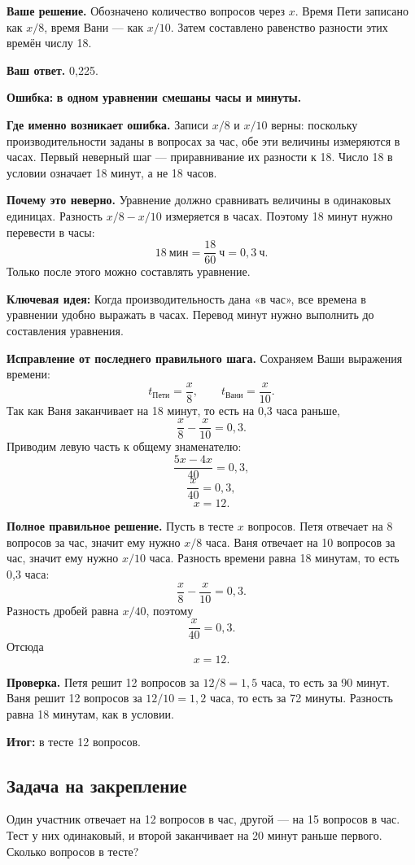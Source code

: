 \documentclass[12pt,a4paper]{article}
\newcommand{\errorlabel}[1]{\textcolor{errred}{\textbf{Ошибка:}} \textbf{#1}}
\newcommand{\keyidea}[1]{\textcolor{ideablue}{\textbf{Ключевая идея:}} #1}
\newcommand{\finalresult}[1]{\textcolor{resultteal}{\textbf{Итог:}} #1}
\begin{document}
\textbf{Ваше решение.} Обозначено количество вопросов через $x$. Время Пети записано как $x/8$, время Вани --- как $x/10$. Затем составлено равенство разности этих времён числу 18.

\textbf{Ваш ответ.} 0,225.

\errorlabel{в одном уравнении смешаны часы и минуты.}

\textbf{Где именно возникает ошибка.} Записи $x/8$ и $x/10$ верны: поскольку производительности заданы в вопросах за час, обе эти величины измеряются в часах. Первый неверный шаг --- приравнивание их разности к 18. Число 18 в условии означает 18 минут, а не 18 часов.

\textbf{Почему это неверно.} Уравнение должно сравнивать величины в одинаковых единицах. Разность $x/8-x/10$ измеряется в часах. Поэтому 18 минут нужно перевести в часы:
\[
18\ \text{мин}=\frac{18}{60}\ \text{ч}=0{,}3\ \text{ч}.
\]
Только после этого можно составлять уравнение.

\keyidea{Когда производительность дана «в час», все времена в уравнении удобно выражать в часах. Перевод минут нужно выполнить до составления уравнения.}

\textbf{Исправление от последнего правильного шага.} Сохраняем Ваши выражения времени:
\[
t_{\text{Пети}}=\frac{x}{8},\qquad t_{\text{Вани}}=\frac{x}{10}.
\]
Так как Ваня заканчивает на 18 минут, то есть на 0,3 часа раньше,
\[
\frac{x}{8}-\frac{x}{10}=0{,}3.
\]
Приводим левую часть к общему знаменателю:
\[
\frac{5x-4x}{40}=0{,}3,
\]
\[
\frac{x}{40}=0{,}3,
\]
\[
x=12.
\]

\textbf{Полное правильное решение.} Пусть в тесте $x$ вопросов. Петя отвечает на 8 вопросов за час, значит ему нужно $x/8$ часа. Ваня отвечает на 10 вопросов за час, значит ему нужно $x/10$ часа. Разность времени равна 18 минутам, то есть 0,3 часа:
\[
\frac{x}{8}-\frac{x}{10}=0{,}3.
\]
Разность дробей равна $x/40$, поэтому
\[
\frac{x}{40}=0{,}3.
\]
Отсюда
\[
x=12.
\]

\textbf{Проверка.} Петя решит 12 вопросов за $12/8=1{,}5$ часа, то есть за 90 минут. Ваня решит 12 вопросов за $12/10=1{,}2$ часа, то есть за 72 минуты. Разность равна 18 минутам, как в условии.

\finalresult{в тесте 12 вопросов.}

\subsection*{Задача на закрепление}
Один участник отвечает на 12 вопросов в час, другой --- на 15 вопросов в час. Тест у них одинаковый, и второй заканчивает на 20 минут раньше первого. Сколько вопросов в тесте?
\end{document}
